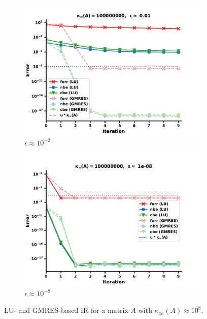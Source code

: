\begin{figure}
\centering
\begin{subfigure}{.5\textwidth}
  \centering
  \includegraphics[width=\linewidth]{chapters/5_experiments/figures/LR512e3_0.pdf}
  \caption{$\epsilon \approx 10^{-2}$}
  \label{fig:lrir4_1}
\end{subfigure}%
\begin{subfigure}{.5\textwidth}
  \centering
  \includegraphics[width=\linewidth]{chapters/5_experiments/figures/LR512e3_1.pdf}
  \caption{$\epsilon \approx 10^{-8}$}
  \label{fig:lrir4_2}
\end{subfigure}
\caption[Low-Rank IR 4]{LU- and GMRES-based IR for a matrix $A$ with $\kappa_\infty(A) \approx 10^8$.}
\label{fig:lrir4}
\end{figure}

